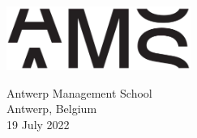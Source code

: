 \begin{titlepage}
\begin{center}
		\vspace{0.8cm}
	
			\includegraphics[width=6cm]{images/ams-logo}
		
		\vspace{0.8cm}
		
		\Large
		Antwerp Management School\\
		Antwerp, Belgium\\
		19 July 2022
	\end{center}
\end{titlepage}